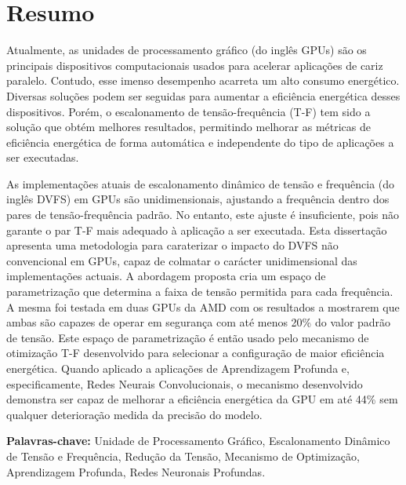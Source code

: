 
\section*{Resumo}


Atualmente, as unidades de processamento gráfico (do inglês GPUs) são os principais dispositivos computacionais usados para acelerar aplicações de cariz paralelo. Contudo, esse imenso desempenho acarreta um alto consumo energético. Diversas soluções podem ser seguidas para aumentar a eficiência energética desses dispositivos. Porém, o escalonamento de tensão-frequência (T-F) tem sido a solução que obtém melhores resultados, permitindo melhorar as métricas de eficiência energética de forma automática e independente do tipo de aplicações a ser executadas. 

As implementações atuais de escalonamento dinâmico de tensão e frequência (do inglês DVFS) em GPUs são unidimensionais, ajustando a frequência dentro dos pares de tensão-frequência padrão. No entanto, este ajuste é insuficiente, pois não garante o par T-F mais adequado à aplicação a ser executada. Esta dissertação apresenta uma metodologia para caraterizar o impacto do DVFS não convencional em GPUs, capaz de colmatar o carácter unidimensional das implementações actuais. A abordagem proposta cria um espaço de parametrização que determina a faixa de tensão permitida para cada frequência. A mesma foi testada em duas GPUs da AMD com os resultados a mostrarem que ambas são capazes de operar em segurança com até menos 20\% do valor padrão de tensão.
Este espaço de parametrização é então usado pelo mecanismo de otimização T-F desenvolvido para selecionar a configuração de maior eficiência energética. Quando aplicado a aplicações de Aprendizagem Profunda e, especificamente, Redes Neurais Convolucionais, o mecanismo desenvolvido demonstra ser capaz de melhorar a eficiência energética da GPU em até 44\% sem qualquer deterioração medida da precisão do modelo.

\vfill

\textbf{\Large Palavras-chave:} Unidade de Processamento Gráfico, Escalonamento Dinâmico de Tensão e Frequência, Redução da Tensão, Mecanismo de Optimização, Aprendizagem Profunda, Redes Neuronais Profundas.
